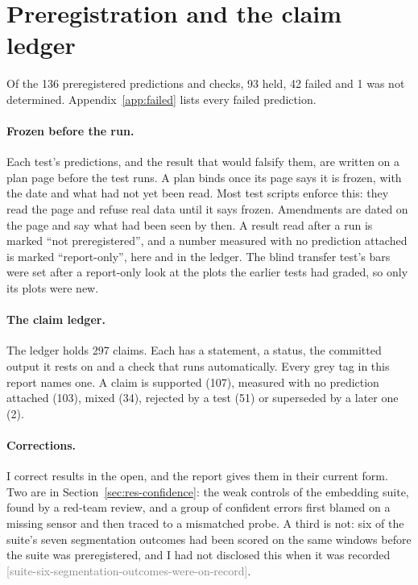 \documentclass[11pt,a4paper]{article}
\newcommand{\claim}[1]{{\scriptsize\textsf{\textcolor{gray}{[#1]}}}}
\begin{document}
\section{Preregistration and the claim ledger}
\label{sec:protocol-ledger}

Of the 136 preregistered predictions and checks, 93 held, 42 failed and 1 was not determined.
Appendix~\ref{app:failed} lists every failed prediction.

\paragraph{Frozen before the run.} Each test's predictions, and the result that would falsify them, are written on a
plan page before the test runs. A plan binds once its page says it is frozen, with the date and what had not yet been
read. Most test scripts enforce this: they read the page and refuse real data until it says frozen. Amendments are
dated on the page and say what had been seen by then. A result read after a run is marked ``not preregistered'', and
a number measured with no prediction attached is marked ``report-only'', here and in the ledger. The blind transfer
test's bars were set after a report-only look at the plots the earlier tests had graded, so only its plots were new.

\paragraph{The claim ledger.} The ledger holds 297 claims. Each has a statement, a status, the committed output it
rests on and a check that runs automatically. Every grey tag in this report names one. A claim is supported (107),
measured with no prediction attached (103), mixed (34), rejected by a test (51) or superseded by a later one (2).

\paragraph{Corrections.} I correct results in the open, and the report gives them in their current form. Two are in
Section~\ref{sec:res-confidence}: the weak controls of the embedding suite, found by a red-team review, and a group
of confident errors first blamed on a missing sensor and then traced to a mismatched probe. A third is not: six of
the suite's seven segmentation outcomes had been scored on the same windows before the suite was preregistered, and
I had not disclosed this when it was recorded \claim{suite-six-segmentation-outcomes-were-on-record}.
\end{document}
